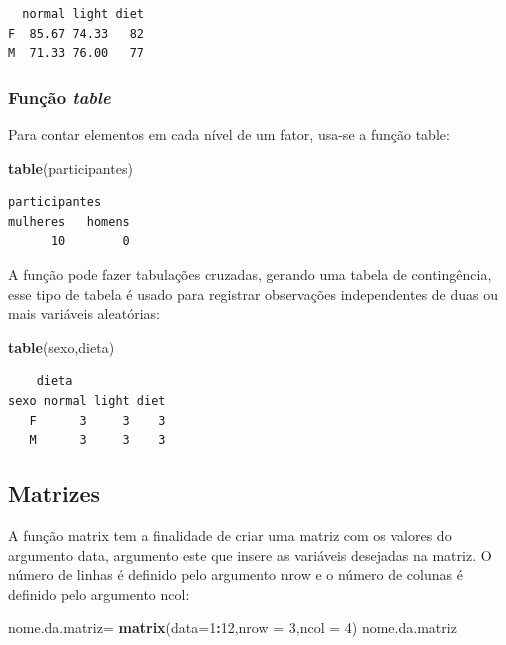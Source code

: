 \documentclass[12pt,brazil,oneside]{book}
\newenvironment{Shaded}{\begin{snugshade}}{\end{snugshade}}
\newcommand{\DataTypeTok}[1]{\textcolor[rgb]{0.13,0.29,0.53}{#1}}
\newcommand{\DecValTok}[1]{\textcolor[rgb]{0.00,0.00,0.81}{#1}}
\newcommand{\KeywordTok}[1]{\textcolor[rgb]{0.13,0.29,0.53}{\textbf{#1}}}
\newcommand{\NormalTok}[1]{#1}
\newcommand{\OperatorTok}[1]{\textcolor[rgb]{0.81,0.36,0.00}{\textbf{#1}}}
\newcommand{\StringTok}[1]{\textcolor[rgb]{0.31,0.60,0.02}{#1}}
\begin{document}
\begin{verbatim}
  normal light diet
F  85.67 74.33   82
M  71.33 76.00   77
\end{verbatim}

\hypertarget{funcao-table}{%
\subsubsection{\texorpdfstring{Função
\emph{table}}{Função table}}\label{funcao-table}}

Para contar elementos em cada nível de um fator, usa-se a função table:

\begin{Shaded}
\begin{Highlighting}[]
\KeywordTok{table}\NormalTok{(participantes)}
\end{Highlighting}
\end{Shaded}

\begin{verbatim}
participantes
mulheres   homens 
      10        0 
\end{verbatim}

A função pode fazer tabulações cruzadas, gerando uma tabela de
contingência, esse tipo de tabela é usado para registrar observações
independentes de duas ou mais variáveis aleatórias:

\begin{Shaded}
\begin{Highlighting}[]
\KeywordTok{table}\NormalTok{(sexo,dieta)}
\end{Highlighting}
\end{Shaded}

\begin{verbatim}
    dieta
sexo normal light diet
   F      3     3    3
   M      3     3    3
\end{verbatim}

\hypertarget{matrizes}{%
\subsection{Matrizes}\label{matrizes}}

A função matrix tem a finalidade de criar uma matriz com os valores do
argumento data, argumento este que insere as variáveis desejadas na
matriz. O número de linhas é definido pelo argumento nrow e o número de
colunas é definido pelo argumento ncol:

\begin{Shaded}
\begin{Highlighting}[]
\NormalTok{nome.da.matriz=}\StringTok{ }\KeywordTok{matrix}\NormalTok{(}\DataTypeTok{data=}\DecValTok{1}\OperatorTok{:}\DecValTok{12}\NormalTok{,}\DataTypeTok{nrow =} \DecValTok{3}\NormalTok{,}\DataTypeTok{ncol =} \DecValTok{4}\NormalTok{)}
\NormalTok{nome.da.matriz}
\end{Highlighting}
\end{Shaded}
\end{document}
